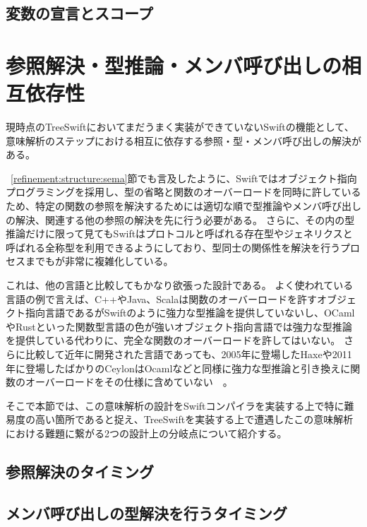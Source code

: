 \subsection{変数の宣言とスコープ}


\section{参照解決・型推論・メンバ呼び出しの相互依存性}

現時点のTreeSwiftにおいてまだうまく実装ができていないSwiftの機能として、意味解析のステップにおける相互に依存する参照・型・メンバ呼び出しの解決がある。

~\ref{refinement:structure:sema}節でも言及したように、Swiftではオブジェクト指向プログラミングを採用し、型の省略と関数のオーバーロードを同時に許しているため、特定の関数の参照を解決するためには適切な順で型推論やメンバ呼び出しの解決、関連する他の参照の解決を先に行う必要がある。
さらに、その内の型推論だけに限って見てもSwiftはプロトコルと呼ばれる存在型やジェネリクスと呼ばれる全称型を利用できるようにしており、型同士の関係性を解決を行うプロセスまでもが非常に複雑化している。

これは、他の言語と比較してもかなり欲張った設計である。
よく使われている言語の例で言えば、C++やJava、Scalaは関数のオーバーロードを許すオブジェクト指向言語であるがSwiftのように強力な型推論を提供していないし、OCamlやRustといった関数型言語の色が強いオブジェクト指向言語では強力な型推論を提供している代わりに、完全な関数のオーバーロードを許してはいない。
さらに比較して近年に開発された言語であっても、2005年に登場したHaxeや2011年に登場したばかりのCeylonはOcamlなどと同様に強力な型推論と引き換えに関数のオーバーロードをその仕様に含めていない~\cite{haxe-overload}~\cite{ceylon-overload}。

そこで本節では、この意味解析の設計をSwiftコンパイラを実装する上で特に難易度の高い箇所であると捉え、TreeSwiftを実装する上で遭遇したこの意味解析における難題に繋がる2つの設計上の分岐点について紹介する。

\subsection{参照解決のタイミング}

\subsection{メンバ呼び出しの型解決を行うタイミング}
